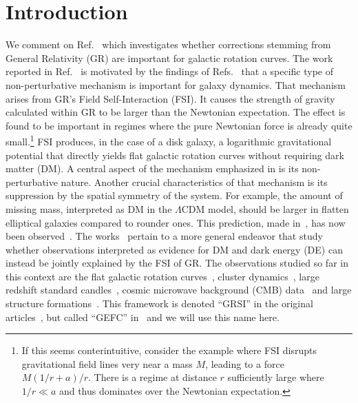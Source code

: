 \documentclass[superscriptaddress,amsmath,amssymb,nofootinbib]{revtex4}
\begin{document}
\section{Introduction} 
We comment on Ref.~\cite{Barker:2023xsx} which investigates whether corrections stemming from General Relativity (GR)
are important for galactic rotation curves. The work reported in Ref.~\cite{Barker:2023xsx} is motivated by the findings of 
Refs.~\cite{Deur:2009ya, Deur:2016bwq, Deur:2020wlg} that a specific type of non-perturbative mechanism is important for galaxy dynamics. 
That mechanism arises from GR's Field Self-Interaction (FSI). 
It causes the strength of gravity calculated within GR to be larger than the Newtonian expectation.
The effect is found to be important in regimes where the pure Newtonian force is already quite small.\footnote{If this seems conterintuitive, 
consider the example where FSI disrupts gravitational field lines very near a mass $M$, leading to a force $M(1/r+a)/r$. There
is a regime at distance $r$ sufficiently large where $1/r \ll a$ and thus dominates over the Newtonian expectation.} 
FSI
produces, in the case of a disk
galaxy, a logarithmic gravitational potential that directly yields flat galactic rotation curves 
without requiring dark matter (DM). A central aspect of the mechanism emphasized in \cite{Deur:2009ya, Deur:2016bwq, Deur:2020wlg} is its non-perturbative nature. 
Another crucial characteristics of that mechanism is its suppression by the spatial symmetry of the system. 
For example, the amount of missing mass, interpreted as DM in the $\Lambda$CDM model, should be
larger in flatten elliptical galaxies compared to rounder ones. This prediction, made in~\cite{Deur:2009ya}, has now been observed~\cite{Deur:2013baa, Winters:2022ruw}.
The works~\cite{Deur:2009ya, Deur:2016bwq, Deur:2020wlg, Deur:2013baa, Winters:2022ruw} pertain to a more general endeavor that study whether 
observations interpreted as evidence for DM and dark energy (DE)
can instead be jointly explained by the FSI of GR.
The observations studied so far in this context are 
the flat galactic rotation curves~\cite{Deur:2009ya, Deur:2016bwq, Deur:2019kqi, Deur:2020wlg}, 
cluster dynamics~\cite{Deur:2009ya},  
large redshift standard candles~\cite{Deur:2017aas}, 
cosmic microwave background (CMB) data~\cite{ Deur:2022ooc} and 
large structure formations~\cite{Deur:2017aas, Deur:2021ink}.
This framework is denoted  ``GRSI'' in the original articles~\cite{Deur:2022ooc, Sargent:2023djq}, 
but called ``GEFC'' in~\cite{Barker:2023xsx} and we will use this name here. 
\end{document}
